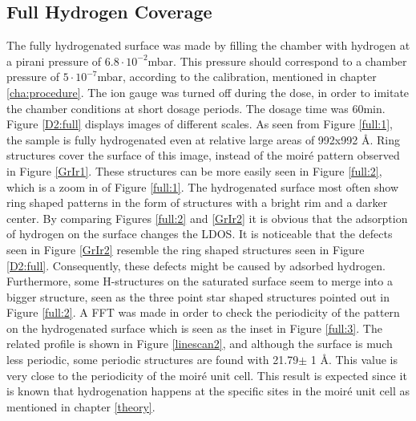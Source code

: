 \subsection{Full Hydrogen Coverage}
The fully hydrogenated surface was made by filling the chamber with hydrogen at a pirani pressure of $6.8 \cdot 10^{-2}$mbar. This pressure should correspond to a chamber pressure of $5 \cdot 10^{-7}$mbar, according to the calibration, mentioned in chapter \ref{cha:procedure}. The ion gauge was turned off during the dose, in order to imitate the chamber conditions at short dosage periods. The dosage time was 60min. \\
Figure \ref{D2:full} displays images of different scales. As seen from Figure \ref{full:1}, the sample is fully hydrogenated even at relative large areas of 992x992 Å. Ring structures cover the surface of this image, instead of the moiré pattern observed in Figure \ref{GrIr1}. These structures can be more easily seen in Figure \ref{full:2}, which is a zoom in of Figure \ref{full:1}. The hydrogenated surface most often show ring shaped patterns in the form of structures with a bright rim and a darker center. By comparing Figures \ref{full:2} and \ref{GrIr2} it is obvious that the adsorption of hydrogen on the surface changes the LDOS. It is noticeable that the defects seen in Figure \ref{GrIr2} resemble the ring shaped structures seen in Figure \ref{D2:full}. Consequently, these defects might be caused by adsorbed hydrogen. Furthermore, some H-structures on the saturated surface seem to merge into a bigger structure, seen as the three point star shaped structures pointed out in Figure \ref{full:2}.
A FFT was made in order to check the periodicity of the pattern on the hydrogenated surface which is seen as the inset in Figure \ref{full:3}. The related profile is shown in Figure \ref{linescan2}, and although the surface is much less periodic, some periodic structures are found with 21.79$ \pm$ 1 Å. This value is very close to the periodicity of the moiré unit cell. This result is expected since it is known that hydrogenation happens at the specific sites in the moiré unit cell as mentioned in chapter \ref{theory}.

